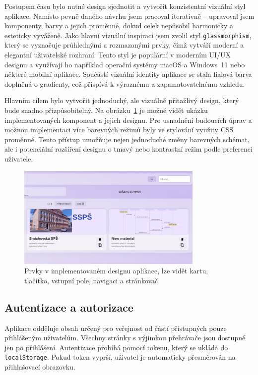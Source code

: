 Postupem času bylo nutné design sjednotit a vytvořit konzistentní vizuální styl aplikace.
Namísto pevně daného návrhu jsem pracoval iterativně -- upravoval jsem komponenty, barvy a jejich proměnné, dokud celek nepůsobil harmonicky a esteticky vyváženě. 
Jako hlavní vizuální inspiraci jsem zvolil styl \texttt{glassmorphism}, který se vyznačuje průhlednými a rozmazanými prvky, čímž vytváří moderní a elegantní uživatelské rozhraní.
Tento styl je populární v moderním UI/UX designu a využívají ho například operační systémy macOS a Windows~11 nebo některé mobilní aplikace.
Součástí vizuální identity aplikace se stala fialová barva doplněná o gradienty, což přispívá k výraznému a zapamatovatelnému vzhledu.

Hlavním cílem bylo vytvořit jednoduchý, ale vizuálně přitažlivý design, který bude snadno přizpůsobitelný.
Na obrázku~\ref{fig:realizace/design} je možné vidět ukázku implementovaných komponent a jejich designu.
Pro usnadnění budoucích úprav a možnou implementaci více barevných režimů byly ve stylování využity CSS proměnné.
Tento přístup umožňuje nejen jednoduché změny barevných schémat, ale i potenciální rozšíření designu o tmavý nebo kontrastní režim podle preferencí uživatele.



\begin{figure}[ht!]
    \centering
    \includegraphics[width=0.8\textwidth]{media/05_realizace/design.png}
    \caption[Prvky v implementovaném designu aplikace]{Prvky v implementovaném designu aplikace, lze vidět kartu, tlačítko, vstupní pole, navigaci a stránkovač}
    \label{fig:realizace/design}
\end{figure}


\subsection{Autentizace a autorizace}

Aplikace odděluje obsah určený pro veřejnost od částí přístupných pouze přihlášeným uživatelům. 
Všechny stránky s výjimkou přehrávače jsou dostupné jen po přihlášení. 
Autentizace probíhá pomocí tokenu, který se ukládá do \texttt{localStorage}. 
Pokud token vyprší, uživatel je automaticky přesměrován na přihlašovací obrazovku.

